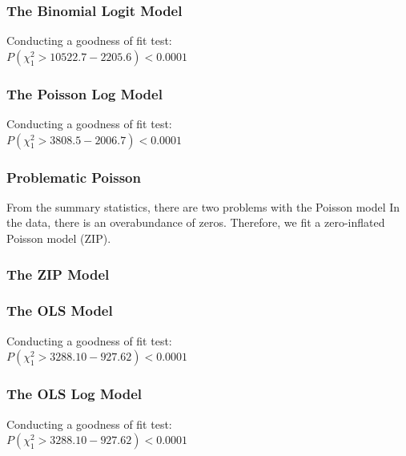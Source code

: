\begin{frame}\frametitle{The Binomial Logit Model}
{\fontsize{8}{3} \color{RBlue} }

Conducting a goodness of fit test: \\
$P(\chi^{2}_{1}>10522.7-2205.6)<0.0001$\\

\end{frame}

\begin{frame}\frametitle{The Poisson Log Model}
{\fontsize{8}{3} \color{RBlue} }

Conducting a goodness of fit test: \\
$P(\chi^{2}_{1}>3808.5-2006.7)<0.0001$\\

\end{frame}

\begin{frame}\frametitle{Problematic Poisson}
From the summary statistics, there are two problems with the Poisson model
In the data, there is an overabundance of zeros.
Therefore, we fit a zero-inflated Poisson model (ZIP).
{\fontsize{8}{3} \color{RBlue} }
\end{frame}

\begin{frame}\frametitle{The ZIP Model}
{\fontsize{8}{3} \color{RBlue} }
\end{frame}

\begin{frame}\frametitle{The OLS Model}
{\fontsize{8}{3} \color{RBlue} }

Conducting a goodness of fit test: \\
$P(\chi^{2}_{1}>3288.10-927.62)<0.0001$\\

\end{frame}

\begin{frame}\frametitle{The OLS Log Model}
{\fontsize{8}{3} \color{RBlue} }

Conducting a goodness of fit test: \\
$P(\chi^{2}_{1}>3288.10-927.62)<0.0001$\\

\end{frame}

